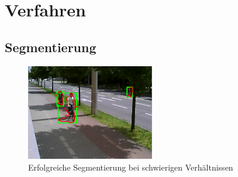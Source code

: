 \documentclass[conference]{IEEEtran}
\begin{document}
%





\section{Verfahren}

\subsection{Segmentierung}

\begin{figure}
\includegraphics[width=0.5\textwidth]{ds10_contour}
\caption{Erfolgreiche Segmentierung bei schwierigen Verhältnissen}
\end{figure}
\end{document}
